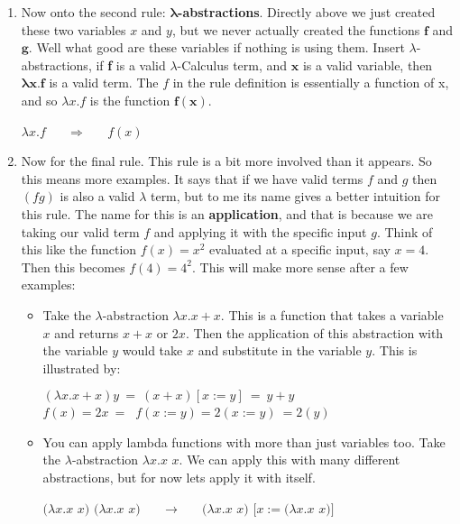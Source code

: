 \documentclass[12pt]{article}
\begin{document}
\begin{enumerate}
\item Now onto the second rule: $\boldsymbol{\lambda}$\textbf{-abstractions}. Directly above we just created these two variables $x$ and $y$, but we never actually created the functions $\mathbf{f}$ and $\mathbf{g}$. Well what good are these variables if nothing is using them. Insert $\lambda$-abstractions, if \textbf{f} is a valid $\lambda$-Calculus term, and $\mathbf{x}$ is a valid variable, then $\boldsymbol{\lambda}\mathbf{x. f}$ is a valid term. The $f$ in the rule definition is essentially a function of x, and so $\lambda x.f$ is the function $\mathbf{f(x)}$. 
\begin{center}
$\lambda x.f$ $\quad$ $\Rightarrow$ $\quad$ $f(x)$ 
\end{center}

\item Now for the final rule. This rule is a bit more involved than it appears. So this means more examples. It says that if we have valid terms $f$ and $g$ then $(fg)$ is also a valid $\lambda$ term, but to me its name gives a better intuition for this rule. The name for this is an \textbf{application}, and that is because we are taking our valid term $f$ and applying it with the specific input $g$. Think of this like the function $f(x) = x^2$ evaluated at a specific input, say $x=4$. Then this becomes $f(4) = 4^2$. This will make more sense after a few examples:
\begin{itemize}
\item Take the $\lambda$-abstraction $\lambda x.x + x$. This is a function that takes a variable $x$ and returns $x+x$ or $2x$. Then the application of this abstraction with the variable $y$ would take $x$ and substitute in the variable $y$. This is illustrated by: 
\begin{center}
$(\lambda x.x + x)y \ = \ (x + x)[x:=y] \ = \ y + y$
\vspace{3mm}
\\$f(x) = 2x \ = \ $  $f(x:=y) = 2(x:=y) \ = 2(y)$
\end{center}
\item You can apply lambda functions with more than just variables too. Take the $\lambda$-abstraction $\lambda x.x$ $x$. We can apply this with many different abstractions, but for now lets apply it with itself. 
\begin{center}$(\lambda x.x$ $x)$ $(\lambda x.x$ $x)$ $\quad$ $\rightarrow$ $\quad$ $(\lambda x.x$ $x)$ $[x := (\lambda x.x$ $x)]$
\end{center}
\begin{center}

\end{center}
\end{itemize}
\end{enumerate}
\end{document}
